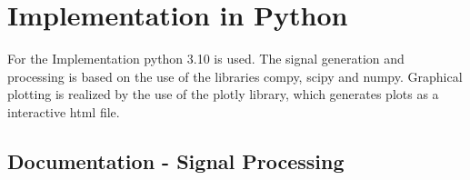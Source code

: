 \chapter{Implementation in Python}

For the Implementation python 3.10 is used. The signal generation and processing is based on the use of the libraries compy, scipy and numpy. Graphical plotting is realized by the use of the plotly library, which generates plots as a interactive html file. 

\section{Documentation - Signal Processing}



